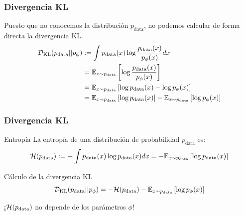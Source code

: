 \documentclass{beamer}
\begin{document}
\begin{frame}
	\frametitle{Divergencia KL}
	Puesto que no conocemos la distribución $p_{\text{data}}$, no podemos calcular 	de forma directa la divergencia KL.
	\begin{align*}
		\mathcal{D}_{\text{KL}}(p_{\text{data}} || p_{\phi})
		&:= \int p_{\text{data}}(x) \log \frac{p_{\text{data}}(x)}{p_{\phi}(x)} dx\\
		&= \mathbb{E}_{x \sim p_{\text{data}}} \left[ \log \frac{p_{\text{data}}(x)}{p_{\phi}(x)} \right]\\
		&= \mathbb{E}_{x \sim p_{\text{data}}} \left[ \log p_{\text{data}}(x) - \log p_{\phi}(x) \right]\\
		&= \mathbb{E}_{x \sim p_{\text{data}}} \left[ \log p_{\text{data}}(x) \right] - \mathbb{E}_{x \sim p_{\text{data}}} \left[ \log p_{\phi}(x) \right]
	\end{align*}
\end{frame}

\begin{frame}
	\frametitle{Divergencia KL}

	\begin{definitionblock}{Entropía}
		La entropía de una distribución de probabilidad $p_{\text{data}}$ es:
		\begin{equation*}
			\mathcal{H}(p_{\text{data}}) := -\int p_{\text{data}}(x) \log p_{\text{data}}(x) dx
			= -\mathbb{E}_{x \sim p_{\text{data}}} \left[ \log p_{\text{data}}(x) \right]
		\end{equation*}
	\end{definitionblock}
	\pause
	\begin{block}{Cálculo de la divergencia KL}
		\begin{equation*}
			\mathcal{D}_{\text{KL}}(p_{\text{data}} || p_{\phi})
			= -\mathcal{H}(p_{\text{data}}) - \mathbb{E}_{x \sim p_{\text{data}}} \left[ \log p_{\phi}(x) \right]
		\end{equation*}
	\end{block}\pause

	\begin{center}
		\alert{¡$\mathcal{H}(p_{\text{data}})$ no depende de los parámetros $\phi$!}
	\end{center}
\end{frame}
\end{document}
